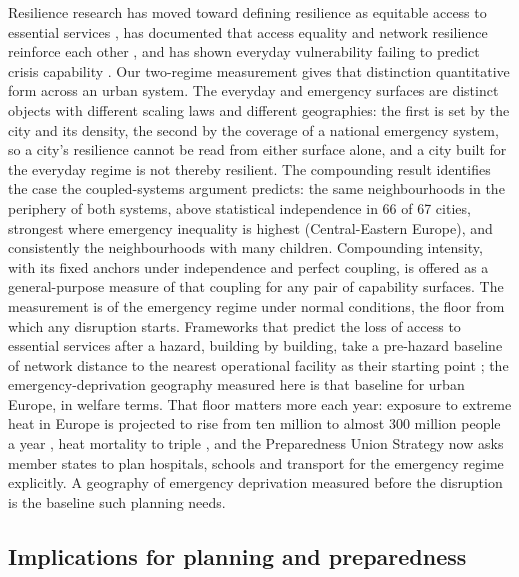 \documentclass[11pt]{article}
\begin{document}
Resilience research has moved toward defining resilience as equitable
access to essential services \citep{logan2020reframing,meerow2016defining},
has documented that access equality and network resilience reinforce each
other \citep{fan2022equality}, and has shown everyday vulnerability
failing to predict crisis capability \citep{sirenko2026heatwaves}. Our
two-regime measurement gives that distinction quantitative form across an
urban system. The everyday and emergency surfaces are distinct objects
with different scaling laws and different geographies: the first is set
by the city and its density, the second by the coverage of a national
emergency system, so a city's resilience cannot be read from either
surface alone, and a city built for the everyday regime is not thereby
resilient. The compounding result identifies the case the coupled-systems
argument predicts: the same neighbourhoods in the periphery of both
systems, above statistical independence in 66 of 67 cities, strongest
where emergency inequality is highest (Central-Eastern Europe), and
consistently the neighbourhoods with many children. Compounding
intensity, with its fixed anchors under independence and perfect coupling,
is offered as a general-purpose measure of that coupling for any pair of
capability surfaces. The measurement is of the emergency regime under
normal conditions, the floor from which any disruption starts. Frameworks
that predict the loss of access to essential services after a hazard,
building by building, take a pre-hazard baseline of network distance to
the nearest operational facility as their starting point
\citep{pagancajigas2026acces}; the emergency-deprivation geography
measured here is that baseline for urban Europe, in welfare terms. That floor
matters more each year: exposure to extreme heat in Europe is projected to
rise from ten million to almost 300 million people a year
\citep{naumann2020heat}, heat mortality to triple
\citep{garcialeon2024mortality}, and the Preparedness Union Strategy
\citep{ec2025preparedness} now asks member states to plan hospitals,
schools and transport for the emergency regime explicitly. A geography of
emergency deprivation measured before the disruption is the baseline such
planning needs.

\subsection{Implications for planning and preparedness}\label{sec:policy}
\end{document}
